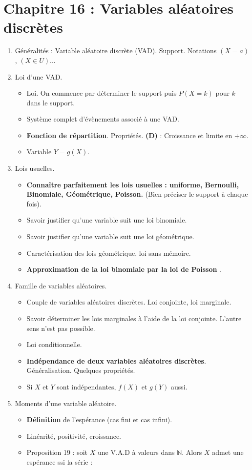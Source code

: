 \documentclass[twoside,a4paper,french,10pt]{VcCours}
\begin{document}
\section*{Chapitre 16 : Variables aléatoires discrètes}
  \begin{enumerate}
  \item Généralités : Variable aléatoire discrète (VAD). Support. Notations $(X=a)$, $(X \in U)$...
  \item Loi d'une VAD.
  \begin{itemize}
  \item Loi. On commence par déterminer le support puis $P(X=k)$ pour $k$ dans le support.
  \item Système complet d'évènements associé à une VAD.
  \item \textbf{Fonction de répartition}. Propriétés. \textbf{(D)} : Croissance et limite en $+ \infty$.
  \item Variable $Y=g(X)$.
  \end{itemize}
  \item Lois usuelles.
  \begin{itemize}
  \item \textbf{Connaître parfaitement les lois usuelles : uniforme, Bernoulli, Binomiale, Géométrique, Poisson.} (Bien préciser le support à chaque fois).
  \item Savoir justifier qu'une variable suit une loi binomiale.
  \item Savoir justifier qu'une variable suit une loi géométrique.
  \item Caractérisation des lois géométrique, loi sans mémoire.
  \item \textbf{Approximation de la loi binomiale par la loi de Poisson%
  }.
  \end{itemize}
  \item Famille de variables aléatoires.
  \begin{itemize}
  \item Couple de variables aléatoires discrètes. Loi conjointe, loi marginale.
  \item Savoir déterminer les lois marginales à l'aide de la loi conjointe. L'autre sens n'est pas possible.
  \item Loi conditionnelle.
  \item \textbf{Indépendance de deux variables aléatoires discrètes}. Généralisation. Quelques propriétés.
  \item Si $X$ et $Y$ sont indépendantes, $f(X)$ et $g(Y)$ aussi.
  \end{itemize}
  \item Moments d'une variable aléatoire.
  \begin{itemize}
  \item \textbf{Définition} de l'espérance (cas fini et cas infini).
  \item Linéarité, positivité, croissance.
  \item Proposition 19 : soit $X$ une V.A.D à valeurs dans $\mathbb{N}$. Alors $X$ admet une espérance ssi la série :
  

\end{itemize}
\end{enumerate}
\end{document}
